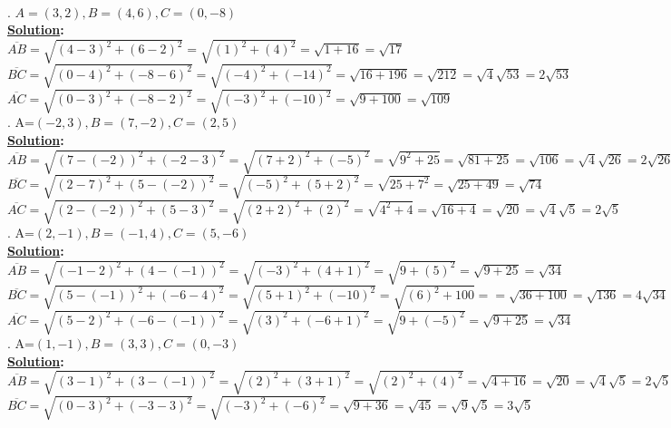 \documentclass[10pt,letterpaper]{article}
\begin{document}
\\
. $A=(3, 2), B=(4, 6), C=(0, -8)$\\
\textbf{\underline {Solution}:}\\
\newline $\overline{AB} =\sqrt{(4-3)^2+(6-2)^2}=\sqrt{(1)^2+(4)^2}=\sqrt{1+16}=\sqrt{17}$
\newline $\overline{BC} =\sqrt{(0-4)^2+(-8-6)^2}=\sqrt{(-4)^2+(-14)^2}=\sqrt{16+196}=\sqrt{212}=\sqrt{4}\sqrt{53}=2\sqrt{53}$
\newline $\overline{AC} =\sqrt{(0-3)^2+(-8-2)^2}=\sqrt{(-3)^2+(-10)^2}=\sqrt{9+100}=\sqrt{109}$
\\
. A=$(-2, 3), B=(7, -2), C=(2, 5)$\\
\textbf{\underline {Solution}:}\\
\newline $\overline{AB} =\sqrt{(7-(-2))^2+(-2-3)^2}=\sqrt{(7+2)^2+(-5)^2}=\sqrt{9^2+25}=\sqrt{81+25}=\sqrt{106}=\sqrt{4}\sqrt{26}=2\sqrt{26}$
\newline $\overline{BC} =\sqrt{(2-7)^2+(5-(-2))^2}=\sqrt{(-5)^2+(5+2)^2}=\sqrt{25+7^2}=\sqrt{25+49}=\sqrt{74}$
\newline $\overline{AC} =\sqrt{(2-(-2))^2+(5-3)^2}=\sqrt{(2+2)^2+(2)^2}=\sqrt{4^2+4}=\sqrt{16+4}=\sqrt{20}=\sqrt{4}\sqrt{5}=2\sqrt{5}$
\\
. A=$(2, -1), B=(-1, 4), C=(5, -6)$\\
\textbf{\underline {Solution}:}\\
\newline $\overline{AB} =\sqrt{(-1-2)^2+(4-(-1))^2}=\sqrt{(-3)^2+(4+1)^2}=\sqrt{9+(5)^2}=\sqrt{9+25}=\sqrt{34}$
\newline $\overline{BC} =\sqrt{(5-(-1))^2+(-6-4)^2}=\sqrt{(5+1)^2+(-10)^2}=\sqrt{(6)^2+100}==\sqrt{36+100}=\sqrt{136}=4\sqrt{34}$
\newline $\overline{AC} =\sqrt{(5-2)^2+(-6-(-1))^2}=\sqrt{(3)^2+(-6+1)^2}=\sqrt{9+(-5)^2}=\sqrt{9+25}=\sqrt{34}$
\\
. A=$(1, -1), B=(3, 3), C=(0, -3)$\\
\textbf{\underline {Solution}:}\\
\newline $\overline{AB} =\sqrt{(3-1)^2+(3-(-1))^2}=\sqrt{(2)^2+(3+1)^2}=\sqrt{(2)^2+(4)^2}=\sqrt{4+16}=\sqrt{20}=\sqrt{4}\sqrt{5}=2\sqrt{5}$
\newline $\overline{BC} =\sqrt{(0-3)^2+(-3-3)^2}=\sqrt{(-3)^2+(-6)^2}=\sqrt{9+36}=\sqrt{45}=\sqrt{9}\sqrt{5}=3\sqrt{5}$
\end{document}
